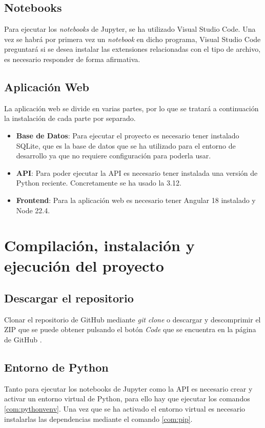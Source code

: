 \subsection{Notebooks}
Para ejecutar los \textit{notebooks} de Jupyter, se ha utilizado Visual Studio Code. Una vez se habrá por primera vez un \textit{notebook} en dicho programa, Visual Studio Code preguntará si se desea instalar las extensiones relacionadas con el tipo de archivo, es necesario responder de forma afirmativa.

\subsection{Aplicación Web}
La aplicación web se divide en varias partes, por lo que se tratará a continuación la instalación de cada parte por separado.
\begin{itemize}
	\item \textbf{Base de Datos}: Para ejecutar el proyecto es necesario tener instalado SQLite, que es la base de datos que se ha utilizado para el entorno de desarrollo ya que no requiere configuración para poderla usar.
	
	\item \textbf{API}: Para poder ejecutar la API es necesario tener instalada una versión de Python reciente. Concretamente se ha usado la 3.12. 
	
	\item \textbf{Frontend}: Para la aplicación web es necesario tener Angular 18 instalado y Node 22.4.
\end{itemize}

\section{Compilación, instalación y ejecución del proyecto}

\subsection{Descargar el repositorio}
Clonar el repositorio de GitHub mediante \textit{git clone} o descargar y descomprimir el ZIP que se puede obtener pulsando el botón \textit{Code} que se encuentra en la página de GitHub \cite{repo}.

\subsection{Entorno de Python}
Tanto para ejecutar los notebooks de Jupyter como la API es necesario crear y activar un entorno virtual de Python, para ello hay que ejecutar los comandos \ref{com:pythonvenv}. Una vez que se ha activado el entorno virtual es necesario instalarlas las dependencias mediante el comando \ref{com:pip}.

